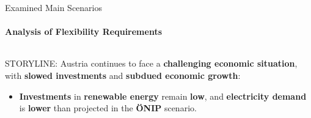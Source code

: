 \documentclass[aspectratio=169]{beamer}
\begin{document}
\begin{frame}{Examined Main Scenarios}
    \framesubtitle{Analysis of Flexibility Requirements}

    \vspace{-.9cm}
    \begin{columns}
        \begin{column}{0.32\textwidth}
            \begin{coloredblock}
                \begin{minipage}[t][5cm]{0.9\textwidth} 
                    \scriptsize STORYLINE: Austria continues to face a \textbf{challenging economic situation}, with \textbf{slowed investments} and \textbf{subdued economic growth}:
                \end{minipage}
                \begin{minipage}[t][4.2cm]{0.9\textwidth}
                    \begin{itemize}
                        \item \scriptsize \textbf{Investments} in \textbf{renewable energy} remain \textbf{low}, and \textbf{electricity demand} is \textbf{lower} than projected in the \textbf{ÖNIP} scenario.


\end{itemize}
\end{minipage}
\end{coloredblock}
\end{column}
\end{columns}
\end{frame}
\end{document}
